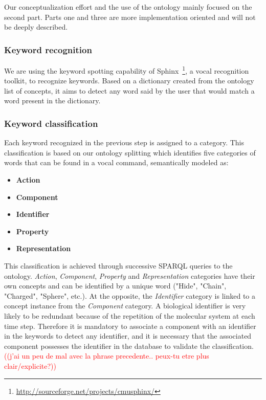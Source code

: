 \documentclass{vgtc}                          %
\newcommand*\mvb[1]{\textcolor{red}{#1}}
\begin{document}
Our conceptualization effort and the use of the ontology mainly focused on the second part. Parts one and three are more implementation oriented and will not be deeply described.

\subsubsection{Keyword recognition}

We are using the keyword spotting capability of Sphinx~\footnote{\url{http://sourceforge.net/projects/cmusphinx/}}, a vocal recognition toolkit, to recognize keywords. Based on a dictionary created from the ontology list of concepts, it aims to detect any word said by the user that would match a word present in the dictionary.

\subsubsection{Keyword classification}

Each keyword recognized in the previous step is assigned to a category. This classification is based on our ontology splitting which identifies five categories of words that can be found in a vocal command, semantically modeled as:

\begin{itemize}
  \item \textbf{Action}
  \item \textbf{Component}
  \item \textbf{Identifier}
  \item \textbf{Property}
  \item \textbf{Representation}
\end{itemize}

This classification is achieved through successive SPARQL queries to the ontology. \textit{Action}, \textit{Component}, \textit{Property} and \textit{Representation} categories have their own concepts and can be identified by a unique word ("Hide", "Chain", "Charged", "Sphere", etc.). At the opposite, the \textit{Identifier} category is linked to a concept instance from the \textit{Component} category. A biological identifier is very likely to be redundant because of the repetition of the molecular system at each time step. Therefore it is mandatory to associate a component with an identifier in the keywords to detect any identifier, and it is necessary that the associated component possesses the identifier in the database to validate the classification. \mvb{((j'ai un peu de mal avec la phrase precedente.. peux-tu etre plus clair/explicite?))}
\end{document}
